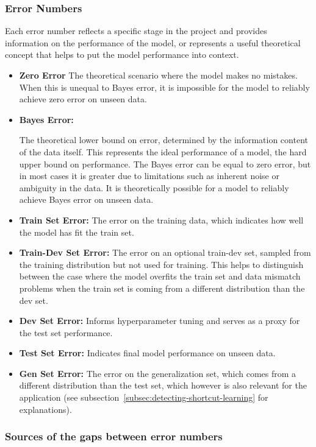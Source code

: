 \documentclass[12pt,openany]{book}
\begin{document}
\subsubsection{Error Numbers}
Each error number reflects a specific stage in the project and provides information on the performance of the model, or represents a useful theoretical concept that helps to put the model performance into context.
\begin{itemize}
    \item \textbf{Zero Error} The theoretical scenario where the model makes no mistakes. When this is unequal to Bayes error, it is impossible for the model to reliably achieve zero error on unseen data.
    \item \hypertarget{bayes-error}{\textbf{Bayes Error:}} The theoretical lower bound on error, determined by the information content of the data itself. This represents the ideal performance of a model, the hard upper bound on performance. The Bayes error can be equal to zero error, but in most cases it is greater due to limitations such as inherent noise or ambiguity in the data. It is theoretically possible for a model to reliably achieve Bayes error on unseen data.
    \item \textbf{Train Set Error:} The error on the training data, which indicates how well the model has fit the train set.
    \item \textbf{Train-Dev Set Error:} The error on an optional train-dev set, sampled from the training distribution but not used for training. This helps to distinguish between the case where the model overfits the train set and data mismatch problems when the train set is coming from a different distribution than the dev set.
    \item \textbf{Dev Set Error:} Informs hyperparameter tuning and serves as a proxy for the test set performance.
    \item \textbf{Test Set Error:} Indicates final model performance on unseen data.
    \item \textbf{Gen Set Error:} The error on the generalization set, which comes from a different distribution than the test set, which however is also relevant for the application (see subsection~\ref{subsec:detecting-shortcut-learning} for explanations).
\end{itemize}

\subsubsection{Sources of the gaps between error numbers}
\end{document}
